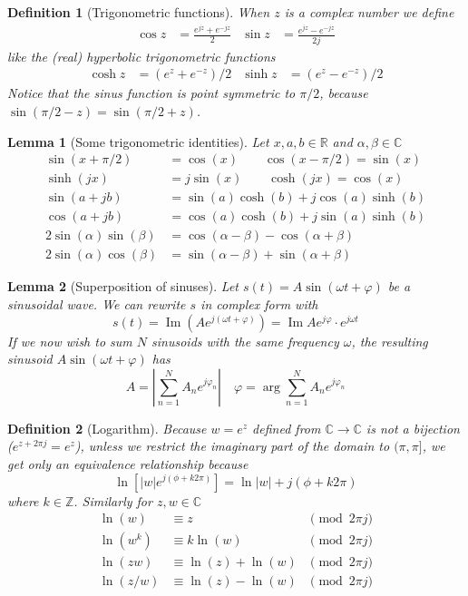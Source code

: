 \documentclass[twocolumn, margin=small]{tex/hsrzf}
\newcommand\Zset{\mathbb{Z}}
\newcommand\Rset{\mathbb{R}}
\newcommand\Cset{\mathbb{C}}
\newcommand\len[1]{\lvert#1\rvert}
\renewcommand\Im{\operatorname{Im}}
\theoremstyle{komfourzf}
\newtheorem{definition}{Definition}
\newtheorem{lemma}{Lemma}
\begin{document}
\begin{definition}[Trigonometric functions]
  When \(z\) is a complex number we define
  \begin{align*}
    \cos z &= \frac{e^{jz} + e^{-jz}}{2} &
    \sin z &= \frac{e^{jz} - e^{-jz}}{2j}
  \end{align*}
  like the (real) hyperbolic trigonometric functions
  \begin{align*}
    \cosh z &= \left( e^z + e^{-z} \right)/2 &
    \sinh z &= \left( e^z - e^{-z} \right)/2
  \end{align*}
  Notice that the sinus function is point symmetric to \(\pi/2\), because \(\sin(\pi/2 - z) = \sin(\pi/2 + z)\).
\end{definition}

\begin{lemma}[Some trigonometric identities] Let \(x,a,b \in\Rset\) and \(\alpha,\beta \in\Cset\)
  \begin{align*}
    \sin(x + \pi/2) &= \cos(x) \qquad \cos(x - \pi/2) = \sin(x) \\
    \sinh(jx) &= j\sin(x) \qquad \cosh(jx) = \cos(x) \\
    \sin(a + jb) &= \sin(a)\cosh(b) + j\cos(a)\sinh(b) \\
    \cos(a + jb) &= \cos(a)\cosh(b) + j\sin(a)\sinh(b) \\
    2\sin(\alpha)\sin(\beta) &= \cos(\alpha - \beta) - \cos(\alpha + \beta) \\
    2\sin(\alpha)\cos(\beta) &= \sin(\alpha - \beta) + \sin(\alpha + \beta)
  \end{align*}
\end{lemma}

\begin{lemma}[Superposition of sinuses]
  Let \(s(t) = A\sin(\omega t + \varphi)\) be a sinusoidal wave.
  We can rewrite \(s\) in complex form with
  \[
    s(t) = \Im\left(Ae^{j(\omega t + \varphi)}\right) = \Im
      Ae^{j\varphi}\cdot e^{j\omega t}
  \]
  If we now wish to sum \(N\) sinusoids with the same frequency \(\omega\), the resulting sinusoid \(A\sin(\omega t + \varphi)\) has
  \[
    A = \left\lvert \sum_{n=1}^N A_n e^{j\varphi_n} \right\lvert
    \quad
    \varphi = \arg\sum_{n=1}^N A_n e^{j\varphi_n}
  \]
\end{lemma}

\begin{definition}[Logarithm]
  Because \(w = e^z\) defined from \(\Cset \to \Cset\) is not a bijection (\(e^{z + 2\pi j} = e^z\)), unless we restrict the imaginary part of the domain to \((\pi, \pi]\), we get only an equivalence relationship because
  \[
    \ln\left[\len{w} e^{j(\phi + k2\pi)}\right] = \ln\len{w} + j(\phi + k2\pi)
  \]
  where \(k \in\Zset\). Similarly for \(z,w\in\Cset\)
  \begin{align*}
    \ln(w) &\equiv z &\pmod{2\pi j} \\
    \ln(w^k) &\equiv k\ln(w) &\pmod{2\pi j} \\
    \ln(zw) &\equiv \ln(z) + \ln(w) &\pmod{2\pi j} \\
    \ln(z/w) &\equiv \ln(z) - \ln(w) &\pmod{2\pi j}
  \end{align*}
\end{definition}
\end{document}
